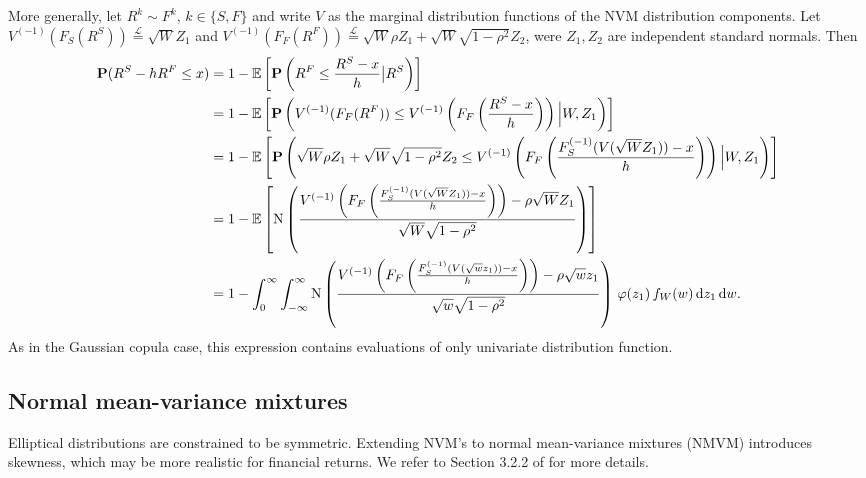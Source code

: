 More generally, let $R^k\sim F^k$, $k\in \{S,F\}$ and write $V$
as the marginal distribution functions of the NVM distribution
components. Let $V^{(-1)}(F_S(R^S)) \stackrel{\mathcal L}{=} \sqrt{W}
Z_1$ and $V^{(-1)}(F_F(R^F)) \stackrel{\mathcal L}{=} 
\sqrt{W} \rho Z_1 + \sqrt{W} \sqrt{1-\rho^2} Z_2$, were $Z_1, Z_2$ are
independent standard normals. Then 
\begin{align*}
  \p(R^S-h R^F\leq x)
  &= 1-\E\left[ \p\left(R^F\leq \frac{R^S-x}{h}\big| R^S\right)\right] \\ %
  &= 1-\E\left[\p \left(V^{(-1)}(F_F(R^F)) \leq
    V^{(-1)}\left(F_F\left(\frac{R^S-x}{h}\right)\right) \Big|
    W, Z_1\right)\right] \\%
  &= 1-\E\left[ \p\left(\sqrt{W} \rho Z_1 + \sqrt{W} \sqrt{1-\rho^2}
    Z_2\leq V^{(-1)}\left(F_F\left(\frac{F_S^{(-1)}(V(\sqrt{W}
    Z_1))-x}{h}\right)\right) \Big| W, Z_1\right)\right]\\ %
  &= 1-\E\left[ \Ncdf \left(
    \frac{V^{(-1)}\left(F_F\left(\frac{F_S^{(-1)}(V(\sqrt{W}
    Z_1))-x}{h}\right)\right) -\rho \sqrt{W} Z_1} {
    \sqrt{W}\sqrt{1-\rho^2}}\right)\right]\\ 
  &= 1-\int_0^\infty \int_{-\infty}^{\infty} \Ncdf \left(
    \frac{V^{(-1)}\left(F_F\left(\frac{F_S^{(-1)}(V(\sqrt{w}
    z_1))-x}{h}\right)\right) -\rho\sqrt{w} z_1} { \sqrt{w}
    \sqrt{1-\rho^2}}\right) \, \varphi(z_1)\, f_W(w)\, \dd z_1\, \dd
    w.%
\end{align*}
As in the Gaussian copula case, this expression contains evaluations
of only univariate distribution function. 

\subsection{Normal mean-variance mixtures}
\label{sec:normal-mean-variance}

Elliptical distributions are constrained to be symmetric. Extending
NVM's to normal mean-variance mixtures (NMVM) introduces skewness,
which may be more realistic for financial returns. We refer to Section
3.2.2 of \citep{McNeil2005} for more details.

